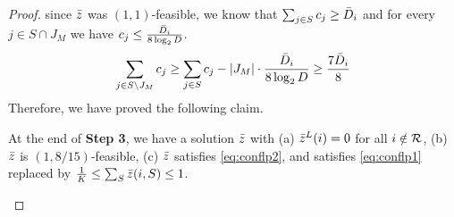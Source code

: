 \begin{proof}
since $\bar z$ was $(1,1)$-feasible, we know that $\sum_{j\in S} c_j \geq \bar{D}_i$ and for every $j\in S\cap J_M$ we have $c_j \leq \frac{\bar{D}_i}{8\log_2 D}$.
\[
\sum_{j\in S\setminus J_M} c_j \geq  \sum_{j\in S} c_j - |J_M|\cdot \frac{\bar{D}_i}{8\log_2 D} \geq \frac{7\bar{D}_i}{8}
\]
Therefore, we have proved the following claim.
\begin{claim}\label{clm:007}
At the end of {\bf  Step 3}, we have a solution $\bar z$ with (a) $\bar z^L(i) = 0$ for all $i\notin {\cal R}$, (b) $\bar z$ is $(1,8/15)$-feasible,
(c) $\bar z$ satisfies \eqref{eq:conflp2}, and satisfies \eqref{eq:conflp1} replaced by $\frac{1}{K} \leq \sum_S \bar z(i,S) \leq 1$.
%
%	
\end{claim}
\smallskip


\end{proof}
